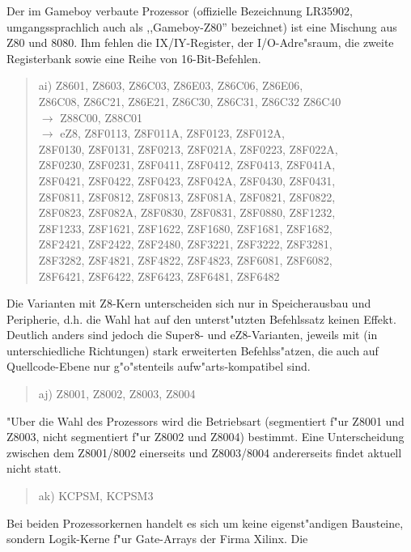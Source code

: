\documentclass[12pt,a4paper,twoside]{report}
\begin{document}
Der im Gameboy verbaute Prozessor (offizielle Bezeichnung LR35902,
umgangssprachlich auch als ,,Gameboy-Z80'' bezeichnet) ist eine
Mischung aus Z80 und 8080.  Ihm fehlen die IX/IY-Register, der
I/O-Adre"sraum, die zweite Registerbank sowie eine Reihe von
16-Bit-Befehlen.
\begin{quote}
ai) Z8601, Z8603, Z86C03, Z86E03, Z86C06, Z86E06, \\
    Z86C08, Z86C21, Z86E21, Z86C30, Z86C31, Z86C32 Z86C40 \\
    $\rightarrow$ Z88C00, Z88C01 \\
    $\rightarrow$ eZ8, Z8F0113, Z8F011A, Z8F0123, Z8F012A, \\
    Z8F0130, Z8F0131, Z8F0213, Z8F021A, Z8F0223, Z8F022A, \\
    Z8F0230, Z8F0231, Z8F0411, Z8F0412, Z8F0413, Z8F041A, \\
    Z8F0421, Z8F0422, Z8F0423, Z8F042A, Z8F0430, Z8F0431, \\
    Z8F0811, Z8F0812, Z8F0813, Z8F081A, Z8F0821, Z8F0822, \\
    Z8F0823, Z8F082A, Z8F0830, Z8F0831, Z8F0880, Z8F1232, \\
    Z8F1233, Z8F1621, Z8F1622, Z8F1680, Z8F1681, Z8F1682, \\
    Z8F2421, Z8F2422, Z8F2480, Z8F3221, Z8F3222, Z8F3281, \\
    Z8F3282, Z8F4821, Z8F4822, Z8F4823, Z8F6081, Z8F6082, \\
    Z8F6421, Z8F6422, Z8F6423, Z8F6481, Z8F6482
\end{quote}
Die Varianten mit Z8-Kern unterscheiden sich nur in
Speicherausbau und Peripherie, d.h. die Wahl hat auf den
unterst"utzten Befehlssatz keinen Effekt.  Deutlich anders sind
jedoch die Super8- und eZ8-Varianten, jeweils mit (in unterschiedliche
Richtungen) stark erweiterten Befehlss"atzen, die auch auf Quellcode-Ebene
nur g"o"stenteils aufw"arts-kompatibel sind.
\begin{quote}
aj) Z8001, Z8002, Z8003, Z8004
\end{quote}
"Uber die Wahl des Prozessors wird die Betriebsart (segmentiert f"ur
Z8001 und Z8003, nicht segmentiert f"ur Z8002 und Z8004) bestimmt.  Eine
Unterscheidung zwischen dem Z8001/8002 einerseits und Z8003/8004 andererseits
findet aktuell nicht statt.
\begin{quote}
ak) KCPSM, KCPSM3
\end{quote}
Bei beiden Prozessorkernen handelt es sich um keine eigenst"andigen
Bausteine, sondern Logik-Kerne f"ur Gate-Arrays der Firma Xilinx.  Die
\end{document}

